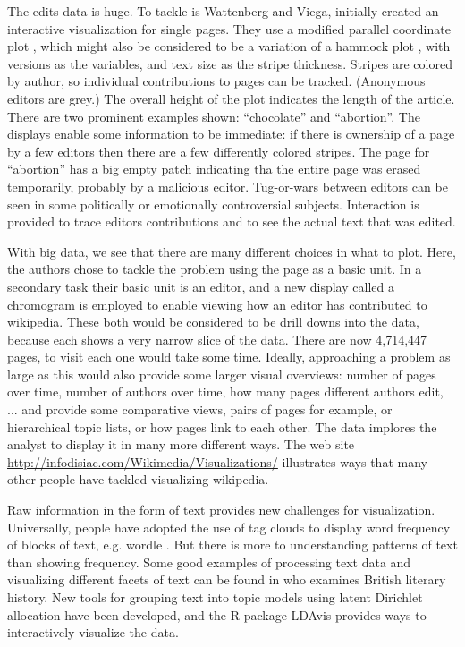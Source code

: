 \documentclass{article}
\begin{document}
The edits data is huge. To tackle is Wattenberg and Viega, initially created an interactive visualization for single pages. They use a modified parallel coordinate plot \citep{In85,We90}, which might also be considered to be a variation of a hammock plot \citep{hammock,ggparallel}, with versions as the variables, and text size as the stripe thickness. Stripes are colored by author, so individual contributions to pages can be tracked. (Anonymous editors are grey.) The overall height of the plot indicates the length of the article. There are two prominent examples shown: ``chocolate'' and ``abortion''. The displays enable some information to be immediate: if there is ownership of a page by a few editors then there are a few differently colored stripes. The page for ``abortion'' has a big empty patch indicating tha the entire page was erased temporarily, probably by a malicious editor. Tug-or-wars between editors can be seen in some politically or emotionally controversial subjects. Interaction is provided to trace editors contributions and to see the actual text that was edited.

With big data, we see that there are many different choices in what to plot. Here, the authors chose to tackle the problem using the page as a basic unit. In a secondary task their basic unit is an editor, and a new display called a chromogram {\color[rgb]{0,0,1} \citep{wattenberg2007visualizing}} is employed to enable viewing how an editor has contributed to wikipedia.  These both would be considered to be drill downs into the data, because each shows a very narrow slice of the data. There are now 4,714,447 pages, to visit each one would take some time. Ideally, approaching a problem as large as this would also provide some larger visual overviews: number of pages over time, number of authors over time, how many pages different authors edit, ... and provide some comparative views, pairs of pages for example, or hierarchical topic lists, or how pages link to each other. The data implores the analyst to display it in many more different ways. The web site \url{http://infodisiac.com/Wikimedia/Visualizations/} illustrates ways that many other people have tackled visualizing wikipedia.

Raw information in the form of text provides new challenges for visualization. Universally, people have adopted the use of tag clouds to display word frequency of blocks of text, e.g. wordle \citep{wordle}. But there is more to understanding patterns of text than showing frequency. Some good examples of processing text data and visualizing different facets of text can be found in \citet{jockers} who examines British literary history. New tools for grouping text into topic models using latent Dirichlet allocation have been developed, and the R \citep{R} package LDAvis \citep{LDAvis} provides ways to interactively visualize the data.
\end{document}
